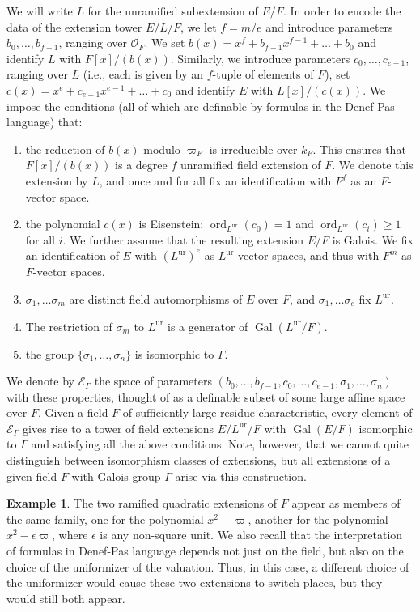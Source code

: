 \documentclass{amsart}
\newcommand{\ri}{\mathcal{O}}
\newcommand{\gal}{\operatorname{Gal}}
\newcommand{\ur}{\mathrm{ur}}
\newcommand\cE{{\mathcal E}}
\DeclareMathOperator{\ord}{ord}
\theoremstyle{plain}
\theoremstyle{definition}
\newtheorem{example}[thm]{Example}
\begin{document}
We will write $L$ for the unramified subextension of $E/F$.  In order to encode the data of the extension tower $E/L/F$, we let $f=m/e$ and introduce parameters $b_0,\dots, b_{f-1}$, ranging over $\ri_F$.
We set $b(x)=x^f+b_{f-1}x^{f-1}+ \dots + b_0$ and identify $L$ with $F[x]/(b(x))$. 
Similarly, we introduce parameters $c_0, \dots, c_{e-1}$, ranging over $L$
(i.e., each is given by an $f$-tuple of elements of $F$), set $c(x) = x^e + c_{e-1}x^{e-1} + \dots + c_0$ and identify $E$ with $L[x]/(c(x))$. 
We impose the conditions (all of which are definable by formulas in the Denef-Pas language) that: 
\begin{enumerate}
\item the reduction of $b(x)$ modulo $\varpi_F$ is irreducible over $k_F$. 
This ensures that $F[x]/(b(x))$ is a degree $f$ unramified field extension of $F$. 
We denote this extension by $L$, and once and for all fix an identification with $F^f$ as 
an $F$-vector space. 
\item the polynomial $c(x)$ is Eisenstein: $\ord_{L^{\ur}}(c_0) = 1$ and $\ord_{L^{\ur}}(c_i) \ge 1$ for all $i$.
We further assume that the resulting extension $E/F$ is Galois.
We fix an identification of $E$ with $(L^\ur)^e$ as $L^\ur$-vector spaces, and thus with $F^m$ as $F$-vector spaces. 
\item $\sigma_1, \dots \sigma_m$ are distinct field automorphisms of $E$ over $F$, and 
 $\sigma_1, \dots \sigma_e$ fix $L^\ur$.
\item The restriction of $\sigma_m$ to $L^\ur$ is a generator of $\gal(L^\ur/F)$. 
\item the group $\{\sigma_1, \dots, \sigma_n\}$ is isomorphic to $\Gamma$.
\end{enumerate}
We denote by $\cE_\Gamma$ the space of parameters $(b_0, \dots, b_{f-1}, c_0, \dots, c_{e-1}, \sigma_1, \dots, \sigma_n)$ with these properties, thought of as a definable subset of some large affine space over $F$. 
Given a field $F$ of sufficiently large residue characteristic, every element of $\cE_\Gamma$ gives rise to a tower of field extensions $E/L^\ur/F$ with $\gal(E/F)$ isomorphic to $\Gamma$ and satisfying all the above conditions. Note, however, that we cannot quite distinguish between 
isomorphism classes of extensions, but all extensions of a given field $F$ with Galois group 
$\Gamma$ arise via this construction.   
\begin{example}
The two ramified quadratic extensions of $F$ appear as members of the same family, one for the 
polynomial $x^2-\varpi$, another for the polynomial $x^2-\epsilon\varpi$, where $\epsilon$  is any non-square unit. We also recall that the interpretation of formulas in Denef-Pas language depends not just on the field, but also on the choice of the uniformizer of the valuation. Thus, in this case, a different choice of the uniformizer would cause these two extensions to switch places, but they would still both appear. 
\end{example}
\end{document}

